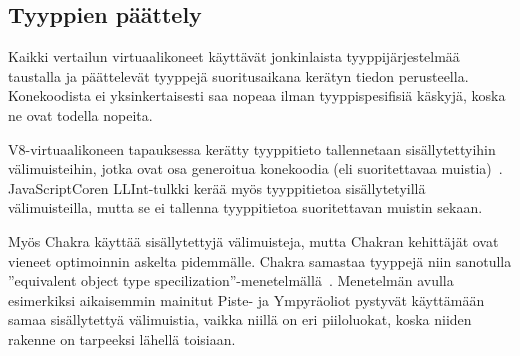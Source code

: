 


\subsection{Tyyppien päättely}

Kaikki vertailun virtuaalikoneet käyttävät jonkinlaista tyyppijärjestelmää taustalla ja päättelevät tyyppejä suoritusaikana kerätyn tiedon perusteella. Konekoodista ei yksinkertaisesti saa nopeaa ilman tyyppispesifisiä käskyjä, koska ne ovat todella nopeita.

V8-virtuaalikoneen tapauksessa kerätty tyyppitieto tallennetaan sisällytettyihin välimuisteihin, jotka ovat osa generoitua konekoodia (eli suoritettavaa muistia)~\cite{llint}. JavaScriptCoren LLInt-tulkki kerää myös tyyppitietoa sisällytetyillä välimuisteilla, mutta se ei tallenna tyyppitietoa suoritettavan muistin sekaan.

Myös Chakra käyttää sisällytettyjä välimuisteja, mutta Chakran kehittäjät ovat vieneet optimoinnin askelta pidemmälle. Chakra samastaa tyyppejä niin sanotulla ''equivalent object type specilization''-menetelmällä~\cite{chakra}. Menetelmän avulla esimerkiksi aikaisemmin mainitut Piste- ja Ympyräoliot pystyvät käyttämään samaa sisällytettyä välimuistia, vaikka niillä on eri piiloluokat, koska niiden rakenne on tarpeeksi lähellä toisiaan.

